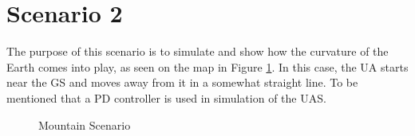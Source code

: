 \section{Scenario 2}\label{sec:scenario2}
The purpose of this scenario is to simulate and show how the curvature of the Earth comes into play, as seen on the map in Figure \ref{fig:s2_map}. In this case, the UA starts near the GS and moves away from it in a somewhat straight line. To be mentioned that a PD controller is used in simulation of the UAS.

\begin{figure}[H]
\hfill
{}
\hfill
{}
\hfill
\caption{Mountain Scenario}
\label{fig:s2_map}
\end{figure}

